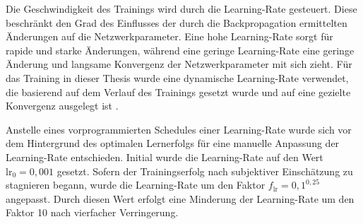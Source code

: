 Die Geschwindigkeit des Trainings wird durch die Learning-Rate gesteuert. Diese beschränkt den Grad des Einflusses der durch die Backpropagation ermittelten Änderungen auf die Netzwerkparameter. Eine hohe Learning-Rate sorgt für rapide und starke Änderungen, während eine geringe Learning-Rate eine geringe Änderung und langsame Konvergenz der Netzwerkparameter mit sich zieht. Für das Training in dieser Thesis wurde eine dynamische Learning-Rate verwendet, die basierend auf dem Verlauf des Trainings gesetzt wurde und auf eine gezielte Konvergenz ausgelegt ist \cite{adaptive_lr_schedule}.

Anstelle eines vorprogrammierten Schedules einer Learning-Rate wurde sich vor dem Hintergrund des optimalen Lernerfolgs für eine manuelle Anpassung der Learning-Rate entschieden. Initial wurde die Learning-Rate auf den Wert $\text{lr}_0 = 0,\!001$ gesetzt. Sofern der Trainingserfolg nach subjektiver Einschätzung zu stagnieren begann, wurde die Learning-Rate um den Faktor $f_\text{lr} = 0,\!1^{0,25}$ angepasst. Durch diesen Wert erfolgt eine Minderung der Learning-Rate um den Faktor 10 nach vierfacher Verringerung.



